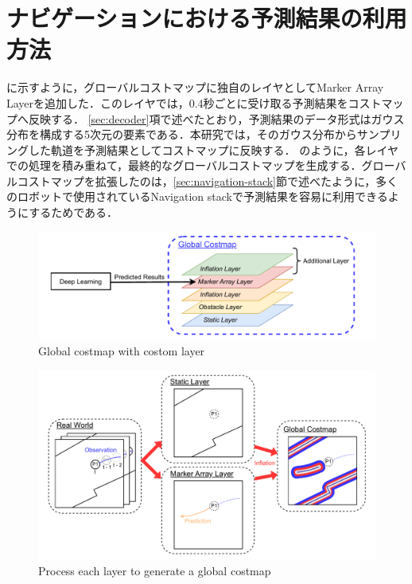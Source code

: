 \section{ナビゲーションにおける予測結果の利用方法}\label{sec:nav-usage}
に示すように，グローバルコストマップに独自のレイヤとしてMarker Array Layerを追加した．このレイヤでは，0.4秒ごとに受け取る予測結果をコストマップへ反映する．
\ref{sec:decoder}項で述べたとおり，予測結果のデータ形式はガウス分布を構成する5次元の要素である．本研究では，そのガウス分布からサンプリングした軌道を予測結果としてコストマップに反映する．
のように，各レイヤでの処理を積み重ねて，最終的なグローバルコストマップを生成する．グローバルコストマップを拡張したのは，\ref{sec:navigation-stack}節で述べたように，多くのロボットで使用されているNavigation stackで予測結果を容易に利用できるようにするためである．

\begin{figure}[H]
  \centering
 \includegraphics[keepaspectratio, scale=0.65]
      {images/layer.pdf}
\caption{Global costmap with costom layer}
 \label{Fig:global-costmap}
\end{figure} 

\vspace{-20pt}

\begin{figure}[H]
  \centering
 \includegraphics[keepaspectratio, scale=0.45]
      {images/costmap-image.pdf}
\caption{Process each layer to generate a global costmap}
 \label{Fig:costmap-flow}
\end{figure} 


\newpage
